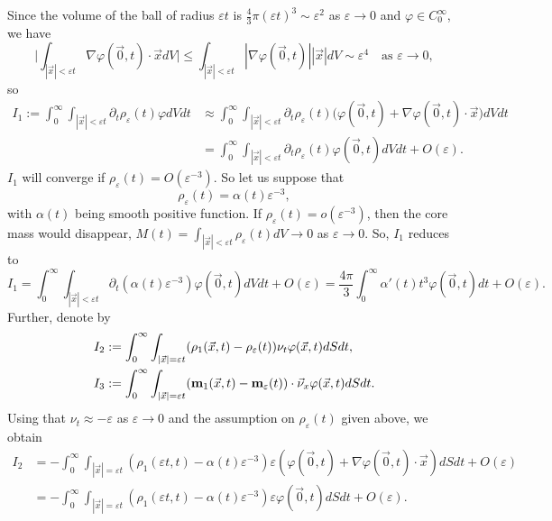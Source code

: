 \documentclass[reqno]{article}%
\theoremstyle{plain}
\theoremstyle{definition}
\theoremstyle{remark}
\numberwithin{equation}{section}
\begin{document}
Since the volume of the ball of radius $\varepsilon t$ is $\frac{4}{3}\pi (\varepsilon t)^3\sim \varepsilon^2$ as $\varepsilon\to 0$ and $\varphi\in C_0^\infty$, we have
\begin{equation}\label{neglect_nabla}
\Big|\int_{|\vec{x}|<\varepsilon t} \nabla \varphi(\vec{0},t)\cdot \vec{x}dV\Big|\leq \int_{|\vec{x}|<\varepsilon t} |\nabla \varphi(\vec{0},t)||\vec{x}|dV\sim \varepsilon^4 \quad \text{as } \varepsilon\to 0,
\end{equation}
so
\[\begin{split}
I_1:=\int_0^\infty\int_{|\vec{x}|<\varepsilon t} \partial_t \rho_\varepsilon(t)\varphi dVdt &\approx \int_0^\infty\int_{|\vec{x}|<\varepsilon t} \partial_t \rho_\varepsilon(t)\big(\varphi(\vec{0},t)+\nabla\varphi(\vec{0},t)\cdot \vec{x}\big) dVdt\\
&= \int_0^\infty\int_{|\vec{x}|<\varepsilon t} \partial_t \rho_\varepsilon(t)\varphi(\vec{0},t) dVdt+O(\varepsilon).
\end{split}\]
$I_1$ will converge if $\rho_\varepsilon(t)=O(\varepsilon^{-3})$. So let us suppose that 
\begin{equation*}\label{assum1}
\rho_\varepsilon(t)=\alpha(t) \varepsilon^{-3},
\end{equation*}
 with $\alpha(t)$ being smooth positive function.
 If $\rho_\varepsilon(t)=o(\varepsilon^{-3})$, then the core mass would disappear, $M(t)=\int_{|\vec{x}|<\varepsilon t} \rho_{\varepsilon}(t)dV\to 0$ as $\varepsilon\to 0$.
So, $I_1$ reduces to 
\[I_1=\int_0^\infty\int_{|\vec{x}|<\varepsilon t} \partial_t (\alpha(t) \varepsilon^{-3})\varphi(\vec{0},t) dVdt+O(\varepsilon)=\frac{4\pi}{3}\int_0^\infty \alpha'(t)t^3\varphi(\vec{0},t)dt+O(\varepsilon).\]
Further, denote by
\[\begin{split}
I_2&:= \int_0^\infty \int_{|\vec{x}|=\varepsilon t}(\rho_1(\vec{x},t)-\rho_\varepsilon(t))\nu_t \varphi(\vec{x},t) dSdt,\\
I_3 &:= \int_0^\infty \int_{|\vec{x}|=\varepsilon t}({\bf m}_1(\vec{x},t)-{\bf m}_\varepsilon(t))\cdot\vec{\nu}_x \varphi(\vec{x},t) dSdt.
\end{split}\]
Using that $\nu_t\approx -\varepsilon$ as $\varepsilon\to 0$ and the assumption on $\rho_\varepsilon(t)$ given above, we obtain
\[\begin{split}
I_2&= -\int_0^\infty \int_{|\vec{x}|=\varepsilon t} (\rho_1(\varepsilon t,t)-\alpha(t)\varepsilon^{-3})\varepsilon(\varphi(\vec{0},t)+\nabla \varphi(\vec{0},t)\cdot \vec{x})dSdt +O(\varepsilon)\\
& = -\int_0^\infty \int_{|\vec{x}|=\varepsilon t} (\rho_1(\varepsilon t,t)-\alpha(t)\varepsilon^{-3})\varepsilon \varphi(\vec{0},t)dSdt +O(\varepsilon).
\end{split}\]
\end{document}

